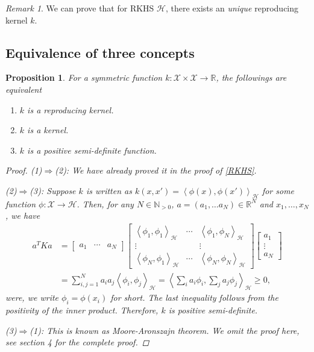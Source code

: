 \documentclass{amsart}
\newtheorem{proposition}[theorem]{Proposition}
\theoremstyle{definition}
\theoremstyle{remark}
\newtheorem{remark}[theorem]{Remark}
\numberwithin{equation}{section}
\begin{document}
\begin{remark}
We can prove that for RKHS $\mathcal{H}$, there exists an \textit{unique} reproducing kernel $k$.
\end{remark}

\subsection{Equivalence of three concepts}

\begin{proposition}
For a symmetric function $k: \mathcal{X}\times \mathcal{X}\to \mathbb{R}$, the followings are equivalent
\begin{enumerate}
\item $k$ is a reproducing kernel.
\item $k$ is a kernel.
\item $k$ is a positive semi-definite function.
\end{enumerate}
\begin{proof}
(1)$\Rightarrow$(2): We have already proved it in the proof of \ref{RKHS}.

(2)$\Rightarrow$(3): Suppose $k$ is written as $k(x, x')=\left<\phi(x), \phi(x')\right>_\mathcal{H}$ for some function
$\phi: \mathcal{X}\to \mathcal{H}$. Then, for any $N\in \mathbb{N}_{>0}$, $a=(a_1, \ldots a_N)\in \mathbb{R}^N$ and $x_1, \ldots, x_N$, we have
\begin{equation}
\begin{split}
a^TKa &= 
\begin{bmatrix}
a_1 & \cdots & a_N
\end{bmatrix}
\begin{bmatrix}
\left<\phi_1, \phi_1 \right>_\mathcal{H} & \cdots & \left<\phi_1, \phi_N \right>_\mathcal{H}\\
\vdots& &\vdots\\
\left<\phi_N, \phi_1 \right>_\mathcal{H} & \cdots & \left<\phi_N, \phi_N \right>_\mathcal{H}
\end{bmatrix}
\begin{bmatrix}
a_1 \\
\vdots \\
a_N
\end{bmatrix}\\
&=\sum_{i, j=1}^{N} a_i a_j \left< \phi_i, \phi_j \right>_\mathcal{H}  = \left< \sum_i a_i \phi_i, \sum_j a_j \phi_j \right>_\mathcal{H} \geq 0,
\end{split}
\end{equation}
were, we write $\phi_i = \phi(x_i)$ for short. The last inequality follows from the positivity of the inner product.
Therefore, $k$ is positive semi-definite.

(3)$\Rightarrow$(1): This is known as \textit{Moore-Aronszajn} theorem.
We omit the proof here, see \cite{Sejdinovic-Gretton} section 4 for the complete proof.
\end{proof}
\end{proposition}
\end{document}
